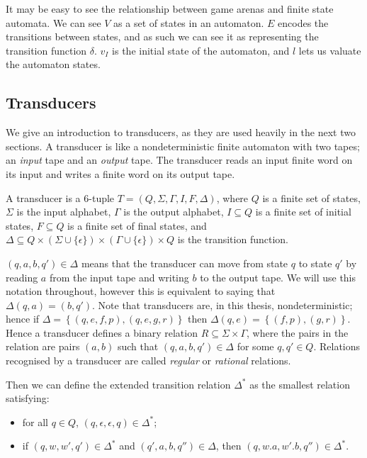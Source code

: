 \documentclass[ %
                    author={Leo Poulson},
                supervisor={Dr. Steven Ramsay},
                    degree={BSc},
                     title={Epistemic Planning for the Dynamic Gossip problem},
                  subtitle={},
                      year={2019} ]{dissertation}
\begin{document}
It may be easy to see the relationship between game arenas and finite state
automata. We can see $V$ as a set of states in an automaton. $E$ encodes the
transitions between states, and as such we can see it as representing the
transition function $\delta$. $v_I$ is the initial state of the automaton, and
$l$ lets us valuate the automaton states. 

\subsection{Transducers}
\label{sec:Transducers}

We give an introduction to transducers, as they are used heavily in the next two
sections. A transducer is like a nondeterministic finite automaton with two
tapes; an \emph{input} tape and an \emph{output} tape. The transducer reads
an input finite word on its input and writes a finite word on its output tape.

A transducer is a 6-tuple $T = (Q, \Sigma, \Gamma, I, F, \Delta)$, where $Q$ is
a finite set of states, $\Sigma$ is the input alphabet, $\Gamma$ is the output
alphabet, $I \subseteq Q$ is a finite set of initial states, $F \subseteq Q$ is
a finite set of final states, and $\Delta \subseteq Q \times \left( \Sigma \cup
  \{\epsilon\} \right) \times \left( \Gamma \cup \{\epsilon\} \right) \times Q$
is the transition function.

$(q, a, b, q') \in \Delta$ means that the transducer can move from state $q$ to
state $q'$ by reading $a$ from the input tape and writing $b$ to the output
tape. We will use this notation throughout, however this is equivalent to saying
that $\Delta(q, a) = (b, q')$. Note that transducers are, in this thesis,
nondeterministic; hence if $\Delta = \left\{ (q, e, f, p), (q, e, g, r)
\right\}$ then $\Delta(q, e) = \left\{ (f, p), (g, r) \right\}$. Hence a
transducer defines a binary relation $R \subseteq \Sigma \times \Gamma$, where
the pairs in the relation are pairs $(a, b)$ such that $(q, a, b, q') \in
\Delta$ for some $q, q' \in Q$. Relations recognised by a transducer are
called \emph{regular} or \emph{rational} relations.

Then we can define the extended transition relation $\Delta^\ast$ as the
smallest relation satisfying:

\begin{itemize}
\item for all $q \in Q$, $(q, \epsilon, \epsilon, q) \in \Delta^\ast$;
\item if $(q, w, w', q') \in \Delta^\ast$ and $(q', a, b, q'') \in \Delta$, then
  $(q, w . a, w' . b, q'') \in \Delta^\ast$.
  
\end{itemize}
\end{document}
